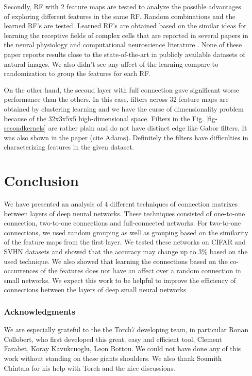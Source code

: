\documentclass{article} %
\begin{document}
Secondly, RF with 2 feature maps are tested to analyze the possible advantages of exploring different features in the same RF. Random combinations and the learned RF's are tested. Learned RF's are obtained  based on the similar ideas for learning the receptive fields of complex cells that are reported in  several papers in the neural physiology and computational neuroscience literature  \cite{masquelier2007learning,spratling2005learning,wiskott2002slow,wallis1997invariant}. None of these paper reports results close to the state-of-the-art in publicly available datasets of natural images. We also didn't see any affect of the learning compare to randomization to group the features for each RF.

On the other hand, the second layer with full connection gave significant worse performance than the others. In this case, filters across 32 feature maps are obtained by clustering learning and we have the curse of dimensionality problem because of the 32x3x5x5 high-dimensional space. Filters in the Fig. \ref{fig-secondkernels} are rather plain and do not have distinct edge like Gabor filters. It was also shown in the paper (cite Adams). Definitely the filters have difficulties in characterizing features in the given dataset.

\section{Conclusion}
\label{sec-conc}

We have presented an analysis of 4 different techniques of connection matrixes
between layers of deep neural networks.  These techniques consisted of one-to-one connection, two-to-one connections and 
full-connected networks. For two-to-one connections, we used random grouping as well as grouping based on the 
similarity of the feature maps from the first layer. 
We tested these networks on CIFAR and SVHN datasets
and showed that the accuracy may change
up to $3\%$ based on the used technique. We also showed that learning
the connections based on the co-occurrences of  the features does not
have an affect over a random connection in small networks.
We expect this work to be helpful to improve the efficiency of connections between the layers of 
deep small neural networks


\subsubsection*{Acknowledgments}
We are especially grateful to the the Torch7 developing team, in particular Ronan Collobert, who first developed this great, easy and efficient tool, Clement Farabet, Koray Kavukcuoglu, Leon Bottou. We could not have done any of this work without standing on these giants shoulders. We also thank Soumith Chintala for his help with Torch and the nice discussions.



\end{document}
